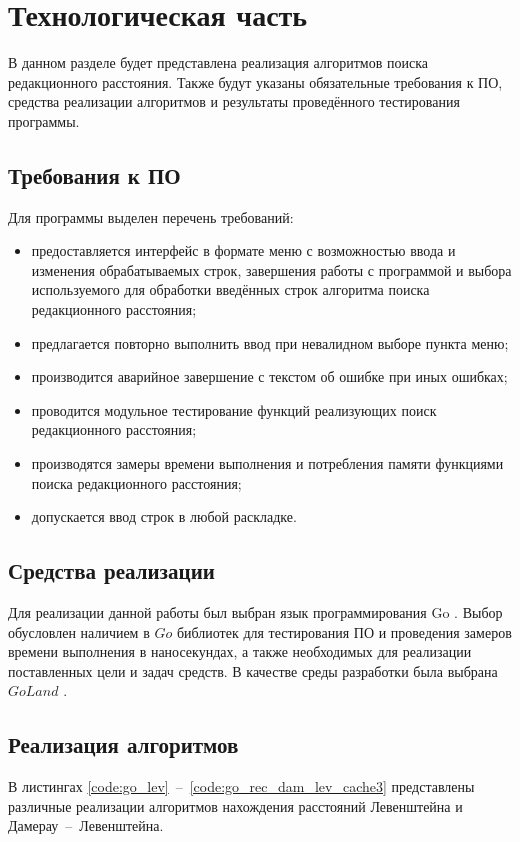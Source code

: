 \chapter{Технологическая часть}

В данном разделе будет представлена реализация алгоритмов поиска редакционного расстояния. Также будут указаны обязательные требования к ПО, средства реализации алгоритмов и результаты проведённого тестирования программы.

\section{Требования к ПО}
Для программы выделен перечень требований:
\begin{itemize}
	\item предоставляется интерфейс в формате меню с возможностью ввода и изменения обрабатываемых строк, завершения работы с программой и выбора используемого для обработки введённых строк алгоритма поиска редакционного расстояния;
	\item предлагается повторно выполнить ввод при невалидном выборе пункта меню;
	\item производится аварийное завершение с текстом об ошибке при иных ошибках;
	\item проводится модульное тестирование функций реализующих поиск редакционного расстояния;
	\item производятся замеры времени выполнения и потребления памяти функциями поиска редакционного расстояния;
	\item допускается ввод строк в любой раскладке.
\end{itemize}

\section{Средства реализации}
Для реализации данной работы был выбран язык программирования Go \cite{web_item2}. Выбор обусловлен наличием в $Go$ библиотек для тестирования ПО и проведения замеров времени выполнения в наносекундах, а также необходимых для реализации поставленных цели и задач средств. В качестве среды разработки была выбрана $GoLand$ \cite{web_item4}.

\section{Реализация алгоритмов}
В листингах \ref{code:go_lev}~--~\ref{code:go_rec_dam_lev_cache3} представлены различные реализации алгоритмов нахождения расстояний Левенштейна и Дамерау~--~Левенштейна.

